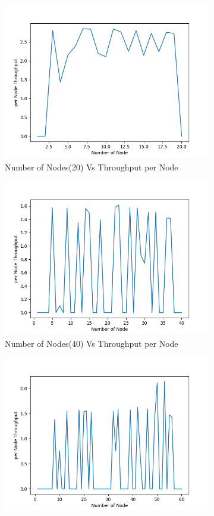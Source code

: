 \begin{figure}[h]
\begin{subfigure}{.5\textwidth}
  \centering
  \includegraphics[width=.8\linewidth]{_15_4_static/NumberofNode(20)vsperNodeThroughput.png}
     \caption{Number of Nodes(20) Vs Throughput per Node}
 \end{subfigure}
\begin{subfigure}{.5\textwidth}
  \centering
  \includegraphics[width=.8\linewidth]{_15_4_static/NumberofNode(40)vsperNodeThroughput.png}
     \caption{Number of Nodes(40) Vs Throughput per Node}
    \end{subfigure}
\begin{subfigure}{.5\textwidth}
    \centering
    \includegraphics[width=.8\linewidth]{_15_4_static/NumberofNode(60)vsperNodeThroughput.png}

\end{subfigure}
\end{figure}
